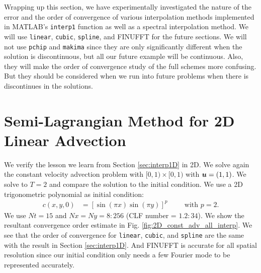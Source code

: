 \documentclass[11pt,letterpaper]{article}
\begin{document}
Wrapping up this section, we have experimentally investigated the nature of the error and the order of convergence of various interpolation methods implemented in MATLAB's \texttt{interp1} function as well as a spectral interpolation method. We will use \texttt{linear}, \texttt{cubic}, \texttt{spline}, and FINUFFT for the future sections. We will not use \texttt{pchip} and \texttt{makima} since they are only significantly different when the solution is discontinuous, but all our future example will be continuous. Also, they will make the order of convergence study of the full \sml\;schemes more confusing. But they should be considered when we run into future problems when there is discontinues in the solutions. 

\section{Semi-Lagrangian Method for 2D Linear Advection}\label{sec:linear_adv}
We verify the lesson we learn from Section \ref{sec:interp1D} in 2D. We solve again the constant velocity advection problem with $[0,1)\times [0,1)$ with $\boldsymbol{u} = (1,1)$. We solve to $T = 2$ and compare the solution to the initial condition. We use a 2D trigonometric polynomial as initial condition:
\begin{align}
    c(x,y,0) &= [\sin(\pi x)\sin(\pi y)]^p \hspace{1cm}\text{with }p = 2.\label{eq:sinp2}
\end{align}
We use $Nt = 15$ and $Nx = Ny = 8:256$ (CLF number = $1.2:34$). We show the resultant convergence order estimate in Fig. \ref{fig:2D_const_adv_all_interp}. We see that the order of convergence for \texttt{linear}, \texttt{cubic}, and \texttt{spline} are the same with the result in Section \ref{sec:interp1D}. And FINUFFT is accurate for all spatial resolution since our initial condition only needs a few Fourier mode to be represented accurately. 
\end{document}
